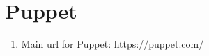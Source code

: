 \section{Puppet}

\begin{enumerate}
\item Main url for Puppet: https://puppet.com/ 
\end{enumerate}
